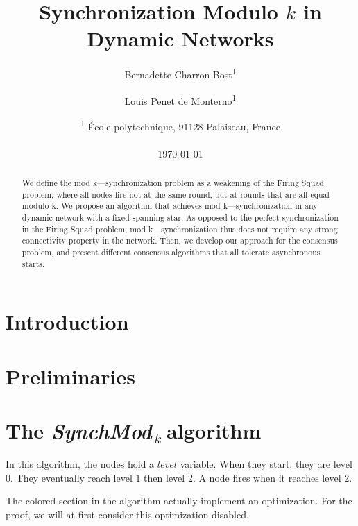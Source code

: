 \documentclass[11pt,letterpaper]{article}
\title{Synchronization Modulo $k$ in Dynamic Networks}
\author{Bernadette Charron-Bost\textsuperscript{1} \and Louis Penet de Monterno\textsuperscript{1}}
\date{\textsuperscript{1} \'Ecole polytechnique, 91128 Palaiseau, France\\~\\ \today}
\newcommand{\SM}{{\em SynchMod}$_{\,k}\ $}
\begin{document}
\maketitle
\tableofcontents

\begin{abstract}
	We define the mod k—synchronization problem as a weakening of the Firing Squad problem,
	where all nodes fire not at the same round, but at rounds that are all equal modulo k.
	We propose an algorithm that achieves mod k—synchronization  in any dynamic network
	with a fixed spanning star. As opposed to the perfect synchronization in
	the Firing Squad problem, mod k—synchronization thus does not require
	any strong connectivity property in the network. 
	Then, we develop our approach for the consensus problem,
	and present different consensus algorithms that all tolerate asynchronous starts.
\end{abstract}

\section{Introduction}

\section{Preliminaries}\label{sec:model}

\section{The \SM algorithm}

In this algorithm, the nodes hold a $level$ variable. When they start, they are level 0. They eventually reach level 1 then level 2.
A node fires when it reaches level 2.

The colored section in the algorithm actually implement an optimization.
For the proof, we will at first consider this optimization disabled.
\end{document}
